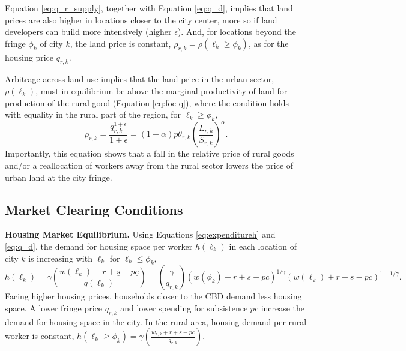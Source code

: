 \documentclass[20250130-paper.tex]{subfiles}
\begin{document}
Equation \eqref{eq:q_r_supply}, together with Equation \eqref{eq:q_d}, implies that land prices are also higher in locations closer to the city center, more so if land developers can build more intensively (higher $\epsilon$). And, for locations beyond the fringe $\phi_k$ of city $k$, the land price is constant, $\rho_{r,k} = \rho(\ell_k \geq \phi_k)$, as for the housing price $q_{r,k}$.

Arbitrage across land use implies that the land price in the urban sector, $\rho(\ell_k)$, must in equilibrium be above the marginal productivity of land for production of the rural good (Equation \eqref{eq:foc-q}), where the condition holds with equality in the rural part of the region, for $\ell_k \geq \phi_k$,
\begin{equation}
\rho_{r,k}=\frac{q_{r,k}^{1+\epsilon}}{ 1+\epsilon }=(1-\alpha)p\theta_{r,k} \left(\frac{L_{r,k}}{S_{r,k}}\right)^{\alpha}. \label{eq:q_r_supply2}
\end{equation}
Importantly, this equation shows that a fall in the relative price of rural goods and/or a reallocation of workers away from the rural sector lowers the price of urban land at the city fringe. 


\subsection{Market Clearing Conditions} \label{sec:Mktclearing}

\textbf{Housing Market Equilibrium.}  Using Equations \eqref{eq:expenditureh} and \eqref{eq:q_d}, the demand for housing space per worker $h(\ell_k)$ in each location of city $k$ is increasing with $\ell_k$ for $\ell_k \leq \phi_k$,
\begin{equation}
h(\ell_k)=\gamma \left( \frac{w(\ell_k)+r+ \underline{s}-p\underline{c}}{q(\ell_k)}\right) =\left(
\frac{\gamma }{q_{r,k}}\right) (w(\phi_k)+r+ \underline{s}-p\underline{c})^{1/\gamma}
(w(\ell_k)+r+ \underline{s}-p\underline{c})^{1-1/\gamma}. \label{eq:Hdemand}
\end{equation}
Facing higher housing prices, households closer to the CBD demand less housing space. A lower fringe price $q_{r,k}$ and lower spending for subsistence $p\underline{c}$ increase the demand for housing space in the city. In the rural area, housing demand per rural worker is constant, $h(\ell_k \geq \phi_k)=\gamma \left( \frac{w_{r,k}+r+ \underline{s}-p\underline{c}}{q_{r,k}}\right)$. 
\end{document}
